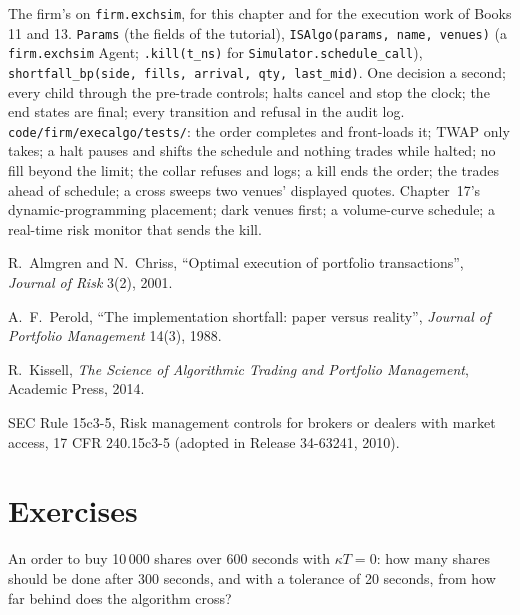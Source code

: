 \begin{build}
 The firm's  on \texttt{firm.exchsim}, for this chapter and for the execution work of Books 11 and 13.
 \texttt{Params} (the fields of the tutorial), \texttt{ISAlgo(params, name, venues)} (a \texttt{firm.exchsim} Agent; \texttt{.kill(t\_ns)} for
\texttt{Simulator.schedule\_call}), \texttt{shortfall\_bp(side, fills, arrival, qty, last\_mid)}.
 One decision a second; every child through the pre-trade controls; halts cancel and stop the clock; the end states are final; every
transition and refusal in the audit log.
 \texttt{code/firm/execalgo/tests/}: the order completes and  front-loads it; TWAP only takes; a halt pauses and shifts
the schedule and nothing trades while halted; no fill beyond the limit; the collar refuses and logs; a kill ends the order; the  trades
ahead of schedule; a cross sweeps two venues' displayed quotes.
 Chapter~17's dynamic-programming placement; dark venues first; a volume-curve schedule; a real-time risk monitor that sends the kill.
\end{build}

\begin{omsources}
\item R.~Almgren and N.~Chriss, ``Optimal execution of portfolio transactions'', \emph{Journal of Risk} 3(2), 2001.
\item A.~F.~Perold, ``The implementation shortfall: paper versus reality'', \emph{Journal of Portfolio Management} 14(3), 1988.
\item R.~Kissell, \emph{The Science of Algorithmic Trading and Portfolio Management}, Academic Press, 2014.
\item SEC Rule 15c3-5, Risk management controls for brokers or dealers with market access, 17 CFR 240.15c3-5 (adopted in Release 34-63241, 2010).
\end{omsources}

\section{Exercises}

\begin{exercise}[$\star$]\label{exo:mx:build-an-execution-algorithm:1}
An order to buy 10\,000 shares over 600 seconds with $\kappa T = 0$: how many shares should be done after 300 seconds, and with a tolerance of 20
seconds, from how far behind does the algorithm cross?
\end{exercise}

